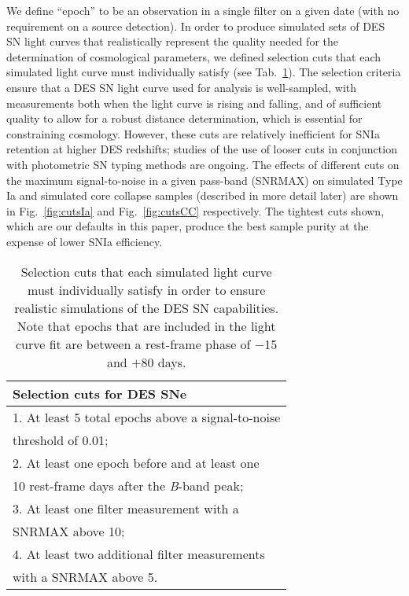 \documentclass[preprint2]{aastex}    %
\begin{document}
We define ``epoch'' to be an observation in a single filter on a given date (with no 
requirement on a source detection). In order to produce simulated sets 
of DES SN light curves that realistically represent the quality needed for the
determination of cosmological parameters, we defined selection cuts that each simulated light
curve must individually satisfy (see Tab.~\ref{tab:cuts}). 
The selection criteria ensure that a DES SN light curve used for analysis is well-sampled, 
with measurements both when the light curve is rising and falling, and of 
sufficient quality to allow for a robust distance determination, which is 
essential for constraining cosmology. However, these cuts are relatively inefficient 
for SNIa retention at higher DES redshifts; studies of the use of looser cuts in conjunction 
with photometric SN typing methods are ongoing. The effects of different 
cuts on the maximum signal-to-noise in a given pass-band (SNRMAX) on simulated Type Ia and 
simulated core collapse samples (described in more detail later) 
are shown in Fig.~\ref{fig:cutsIa} and Fig.~\ref{fig:cutsCC} 
respectively.  The tightest cuts shown, which are our 
defaults in this paper, produce the best sample purity at the 
expense of lower SNIa efficiency. 
\begin{table}[h]
\centering
\begin{tabular}
[l]{l}\hline
Selection cuts for DES SNe\\
\hline
1. At least 5 total epochs above a signal-to-noise\\\hspace{5mm} threshold of 0.01;\\
2. At least one epoch before and at least one\\\hspace{5mm} 10 rest-frame days after the \textit{B}-band peak;\\
3. At least one filter measurement with a\\\hspace{5mm} SNRMAX above 10;\\
4. At least two additional filter measurements\\\hspace{5mm} with a SNRMAX above 5.\\
\hline
\end{tabular}
\caption{Selection cuts that each simulated light curve must individually satisfy 
in order to ensure realistic simulations of the DES SN capabilities. Note that epochs that
are included in the light curve fit are between a rest-frame phase of $-$15 and $+$80 days.}
\label{tab:cuts}
\end{table}
\end{document}
